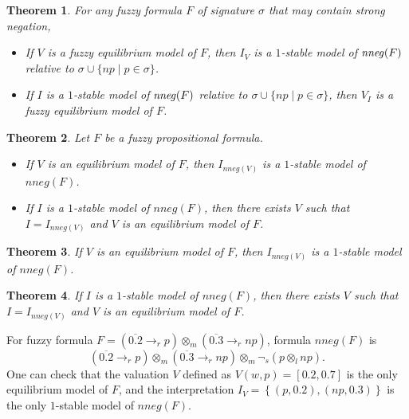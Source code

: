 \documentclass[runningheads]{llncs}
\newcommand{\cgre}{\color{green}}
\newcommand{\cbla}{\color{black}}
\def\i#1{\hbox{\it #1\/}}
\def\rar{\rightarrow}
\def\i#1{\hbox{\itshape #1\/}}
\def\fand{\otimes}
\newtheorem{thm}{Theorem}
\begin{document}
\begin{thm}\label{thm:equil-sm} 
For any fuzzy formula $F$ of signature $\sigma$ that may contain strong negation, 
\begin{itemize}
\item[(a)]  If $V$ is a fuzzy equilibrium model of $F$, then $I_V$ is a $1$-stable model of $\i{nneg}(F)$ relative to  $\sigma\cup\{np \mid p\in\sigma\}$.

\item[(b)]  If $I$ is a $1$-stable model of $\i{nneg}(F)$ relative to
  $\sigma\cup\{np \mid p\in\sigma\}$, then $V_I$ is a fuzzy equilibrium model of $F$. 
\end{itemize}
\end{thm}

\cgre
\begin{thm}\label{thm:equil-sm}
Let $F$ be a fuzzy propositional formula. 
\begin{itemize}
\item[(a)]  If $V$ is an equilibrium model of $F$, then $I_{nneg(V)}$
  is a $1$-stable model of $nneg(F)$.
\item[(b)]  If $I$ is a $1$-stable model of $nneg(F)$, then there
  exists $V$ such that $I=I_{nneg(V)}$ and $V$ is an equilibrium model
  of $F$.
\end{itemize}
\end{thm}
\cbla
\EOCC


\BOCC
\begin{thm}\label{thm:equili2sm_sn}
If $V$ is an equilibrium model of $F$, then $I_{nneg(V)}$ is a $1$-stable model of $nneg(F)$.
\end{thm}

\begin{thm}\label{thm:sm2equili_sn}
If $I$ is a $1$-stable model of $nneg(F)$, then there exists $V$ such that $I=I_{nneg(V)}$ and $V$ is an equilibrium model of $F$.
\end{thm}
\EOCC


\begin{example}
For fuzzy formula 
$F=(\overline{0.2} \rar_r p)\fand_m (\overline{0.3} \rar_r np)$, 
formula $nneg(F)$ is
\[ (\overline{0.2} \rar_r p)\fand_m
   (\overline{0.3} \rar_r np) \fand_m
  \neg_s(p \fand_l np).
\]
One can check that the valuation $V$ defined as $V(w, p)=\left[0.2, 0.7\right]$ is the only equilibrium model of $F$, and the interpretation $I_V=\left\{(p, 0.2), (np, 0.3)\right\}$ is the only $1$-stable model of $nneg(F)$.
\end{example}
\end{document}
